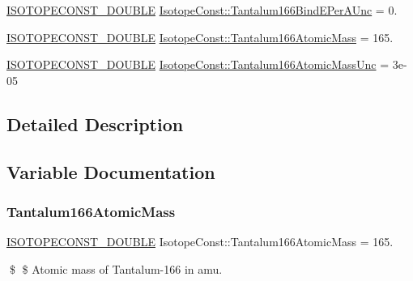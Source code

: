 \begin{DoxyCompactItemize}
\mbox{\hyperlink{group___isotope_const-_macros_ga8f45a7272ce02c0b4c65c44636ed719a}{I\+S\+O\+T\+O\+P\+E\+C\+O\+N\+S\+T\+\_\+\+D\+O\+U\+B\+LE}} \mbox{\hyperlink{group___isotope_const-_tantalum-_ta166_ga0f2d03cdf7b7dee592542c0f47d97edc}{Isotope\+Const\+::\+Tantalum166\+Bind\+E\+Per\+A\+Unc}} = 0.
\item 
\mbox{\hyperlink{group___isotope_const-_macros_ga8f45a7272ce02c0b4c65c44636ed719a}{I\+S\+O\+T\+O\+P\+E\+C\+O\+N\+S\+T\+\_\+\+D\+O\+U\+B\+LE}} \mbox{\hyperlink{group___isotope_const-_tantalum-_ta166_ga1adb8477c27c960d75056cc1e809b9c7}{Isotope\+Const\+::\+Tantalum166\+Atomic\+Mass}} = 165.
\item 
\mbox{\hyperlink{group___isotope_const-_macros_ga8f45a7272ce02c0b4c65c44636ed719a}{I\+S\+O\+T\+O\+P\+E\+C\+O\+N\+S\+T\+\_\+\+D\+O\+U\+B\+LE}} \mbox{\hyperlink{group___isotope_const-_tantalum-_ta166_ga216a03bb4712ff3542d2a5964b75f84e}{Isotope\+Const\+::\+Tantalum166\+Atomic\+Mass\+Unc}} = 3e-\/05
\end{DoxyCompactItemize}


\subsection{Detailed Description}


\subsection{Variable Documentation}
\mbox{\label{group___isotope_const-_tantalum-_ta166_ga1adb8477c27c960d75056cc1e809b9c7}} 
\subsubsection{\texorpdfstring{Tantalum166\+Atomic\+Mass}{Tantalum166AtomicMass}}
{\footnotesize\ttfamily \mbox{\hyperlink{group___isotope_const-_macros_ga8f45a7272ce02c0b4c65c44636ed719a}{I\+S\+O\+T\+O\+P\+E\+C\+O\+N\+S\+T\+\_\+\+D\+O\+U\+B\+LE}} Isotope\+Const\+::\+Tantalum166\+Atomic\+Mass = 165.}

\$ \$ Atomic mass of Tantalum-\/166 in amu. \mbox{\label{group___isotope_const-_tantalum-_ta166_ga216a03bb4712ff3542d2a5964b75f84e}} 
